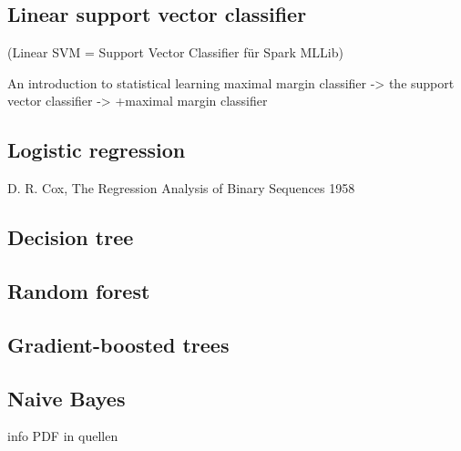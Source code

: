 \subsection{Linear support vector classifier}
(Linear SVM = Support Vector Classifier für Spark MLLib)

An introduction to statistical learning
 maximal margin classifier -> the support vector classifier -> +maximal margin classifier
\subsection{Logistic regression}
D. R. Cox, The Regression Analysis of Binary Sequences 1958
\subsection{Decision tree}
\subsection{Random forest}
\subsection{Gradient-boosted trees}
\subsection{Naive Bayes}
info PDF in quellen